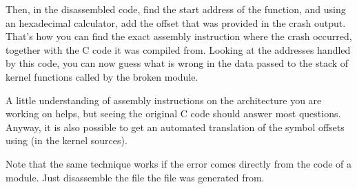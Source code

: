 Then, in the disassembled code, find the start address of the
function, and using an hexadecimal calculator, add the offset that
was provided in the crash output. That's how you can find the
exact assembly instruction where the crash occurred, together
with the C code it was compiled from. Looking at the addresses
handled by this code, you can now guess what is wrong in the
data passed to the stack of kernel functions called by the
broken module.

A little understanding of assembly instructions on the architecture
you are working on helps, but seeing the original C code should answer
most questions. Anyway, it is also possible to get an automated
translation of the symbol offsets using
 (in the kernel sources).

Note that the same technique works if the error comes directly from
the code of a module. Just disassemble the  file
the  file was generated from.
